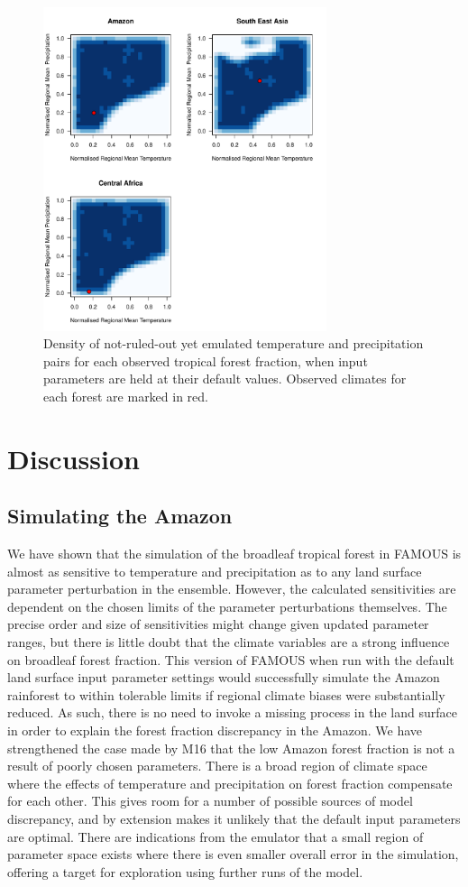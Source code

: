 \documentclass[gmd, manuscript]{copernicus}
\begin{document}
\begin{figure}[t]
\includegraphics[width=8.3cm]{../graphics/nroy_climate.pdf}
\caption{Density of not-ruled-out yet emulated temperature and precipitation pairs for each observed tropical forest fraction, when input parameters are held at their default values. Observed climates for each forest are marked in red. 
}
\label{fig:nroy_climate}
\end{figure}


\section{Discussion}\label{sec:discussion}
\subsection{Simulating the Amazon}\label{ssec:simulating}
We have shown that the simulation of the broadleaf tropical forest in FAMOUS is almost as sensitive to temperature and precipitation as to any land surface parameter perturbation in the ensemble. However, the calculated sensitivities are dependent on the chosen limits of the parameter perturbations themselves. The precise order and size of sensitivities might change given updated parameter ranges, but there is little doubt that the climate variables are a strong influence on broadleaf forest fraction. This version of FAMOUS when run with the default land surface input parameter settings would successfully simulate the Amazon rainforest to within tolerable limits if regional climate biases were substantially reduced. As such, there is no need to invoke a missing process in the land surface in order to explain the forest fraction discrepancy in the Amazon. We have strengthened the case made by M16 that the low Amazon forest fraction is not a result of poorly chosen parameters.  There is a broad region of climate space where the effects of temperature and precipitation on forest fraction compensate for each other. This gives room for a number of possible sources of model discrepancy, and by extension makes it unlikely that the default input parameters are optimal. There are indications from the emulator that a small region of parameter space exists where there is even smaller overall error in the simulation, offering a target for exploration using further runs of the model.
 
\end{document}
